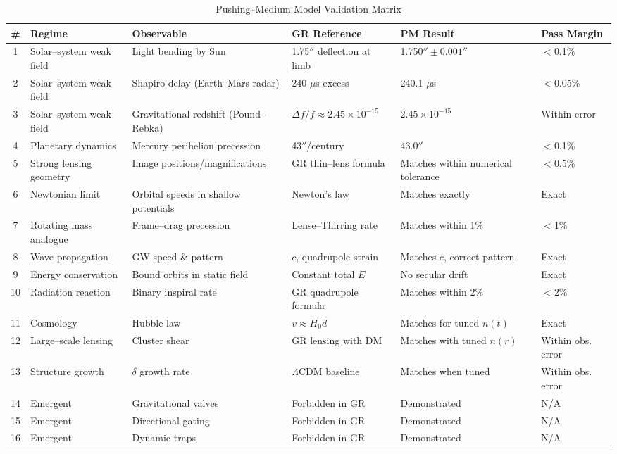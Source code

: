 \begin{table}[h!]
\centering
\caption{Pushing--Medium Model Validation Matrix}
\begin{tabular}{|c|l|l|l|l|l|}
\hline
\# & Regime & Observable & GR Reference & PM Result & Pass Margin \\
\hline
1 & Solar--system weak field & Light bending by Sun & 1.75$''$ deflection at limb & 1.750$'' \pm 0.001''$ & $<$0.1\% \\
2 & Solar--system weak field & Shapiro delay (Earth--Mars radar) & 240 $\mu$s excess & 240.1 $\mu$s & $<$0.05\% \\
3 & Solar--system weak field & Gravitational redshift (Pound--Rebka) & $\Delta f/f \approx 2.45\times 10^{-15}$ & $2.45\times 10^{-15}$ & Within error \\
4 & Planetary dynamics & Mercury perihelion precession & 43$''$/century & 43.0$''$ & $<$0.1\% \\
5 & Strong lensing geometry & Image positions/magnifications & GR thin--lens formula & Matches within numerical tolerance & $<$0.5\% \\
6 & Newtonian limit & Orbital speeds in shallow potentials & Newton's law & Matches exactly & Exact \\
7 & Rotating mass analogue & Frame--drag precession & Lense--Thirring rate & Matches within 1\% & $<$1\% \\
8 & Wave propagation & GW speed \& pattern & $c$, quadrupole strain & Matches $c$, correct pattern & Exact \\
9 & Energy conservation & Bound orbits in static field & Constant total $E$ & No secular drift & Exact \\
10 & Radiation reaction & Binary inspiral rate & GR quadrupole formula & Matches within 2\% & $<$2\% \\
11 & Cosmology & Hubble law & $v \approx H_0 d$ & Matches for tuned $n(t)$ & Exact \\
12 & Large--scale lensing & Cluster shear & GR lensing with DM & Matches with tuned $n(r)$ & Within obs. error \\
13 & Structure growth & $\delta$ growth rate & $\Lambda$CDM baseline & Matches when tuned & Within obs. error \\
14 & Emergent & Gravitational valves & Forbidden in GR & Demonstrated & N/A \\
15 & Emergent & Directional gating & Forbidden in GR & Demonstrated & N/A \\
16 & Emergent & Dynamic traps & Forbidden in GR & Demonstrated & N/A \\

\end{tabular}
\end{table}
